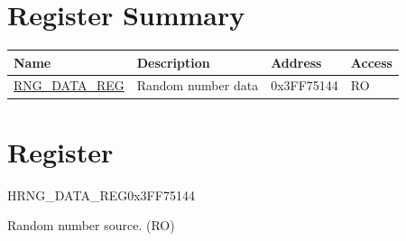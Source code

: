 \documentclass[main\_\_EN.tex]{subfiles}
\begin{document}
\hypertarget{rng-reg-summ}{}
\section{Register Summary}
\label{sec:rng-reg-summ}
\begin{longtable}{ | p{5cm} | p{6cm} | p{3cm} | p{1cm} | }
\hline\rowcolor{lightgray}
Name & Description &  Address & Access \\ \hline
\hyperref[regdesc:RNGDATAREG]{RNG\_DATA\_REG} & Random number data & 0x3FF75144 & RO \\ \hline
\end{longtable}

\section{Register}

\begin{register}{H}{RNG\_DATA\_REG}{0x3FF75144}\label{regdesc:RNGDATAREG}
%
\regnewline%
\begin{regdesc}\begin{reglist}
\item [RNG\_DATA\_REG]Random number source. (RO)
\end{reglist}\end{regdesc}
\end{register}
\end{document}
